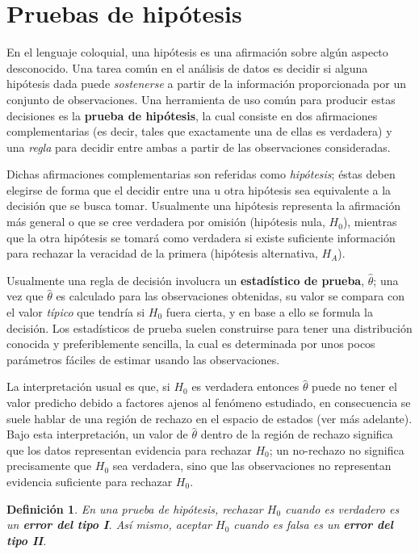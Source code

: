 \documentclass[12pt,letterpaper]{book}
\newtheorem{definicion}{Definición}[chapter]
\newcommand{\est}[1]{\widehat{ #1 }}
\begin{document}
\section{Pruebas de hipótesis}

En el lenguaje coloquial, una hipótesis es una afirmación sobre algún aspecto desconocido.
%
Una tarea común en el análisis de datos es decidir si alguna hipótesis dada puede \textit{sostenerse} a partir de la información proporcionada por un conjunto de observaciones. 
%
Una herramienta de uso común para producir estas decisiones es la \textbf{prueba de hipótesis}, la cual consiste en dos afirmaciones complementarias (es decir, tales que exactamente una de ellas es verdadera) y una \textit{regla} para decidir entre ambas a partir de las observaciones consideradas.

Dichas afirmaciones complementarias son referidas como \textit{hipótesis}; éstas deben elegirse de forma que el decidir entre una u otra hipótesis sea equivalente a la decisión que se busca tomar. 
%
Usualmente una hipótesis representa la afirmación más general o que se cree verdadera por omisión (hipótesis nula, $H_0$), mientras que la otra hipótesis se tomará como verdadera si existe suficiente información para rechazar la veracidad de la primera (hipótesis alternativa, $H_A$).

Usualmente una regla de decisión involucra un \textbf{estadístico de prueba}, $\widehat{\theta}$; una vez que $\widehat{\theta}$ es calculado para las observaciones obtenidas, su valor se compara con el valor \textit{típico} que tendría si $H_0$ fuera cierta, y en base a ello se formula la decisión.
%
Los estadísticos de prueba suelen construirse para tener una distribución conocida y preferiblemente sencilla, la cual es determinada por unos pocos parámetros fáciles de estimar usando las observaciones.

La interpretación usual es que, si $H_0$ es verdadera entonces $\est{\theta}$ puede no tener el valor predicho debido a factores ajenos al fenómeno estudiado, en consecuencia se suele hablar de una región de rechazo en el espacio de estados (ver más adelante).
%
Bajo esta interpretación, un valor de $\widehat{\theta}$ dentro de la región de rechazo significa que los datos representan evidencia para rechazar $H_0$; un no-rechazo no significa precisamente que $H_0$ sea verdadera, sino que las observaciones no representan evidencia suficiente para rechazar $H_0$.

\begin{definicion}
En una prueba de hipótesis, rechazar $H_0$ cuando es verdadero es un \textbf{error del tipo I}. Así mismo, aceptar $H_0$ cuando es falsa es un \textbf{error del tipo II}.
\end{definicion}
\end{document}
